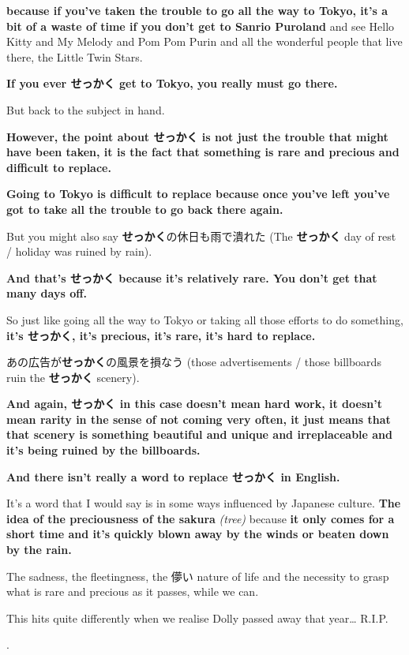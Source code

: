 {\bf because if you've taken the trouble to go all the way to Tokyo, it's a bit of a waste of time if you don't get to Sanrio Puroland} and see Hello Kitty and My Melody and Pom Pom Purin and all the wonderful people that live there, the Little Twin Stars.

{\bf If you ever せっかく get to Tokyo, you really must go there.}

\thinrule

But back to the subject in hand.

{\bf However, the point about せっかく is not just the trouble that might have been taken, it is the fact that something is rare and precious and difficult to replace.}

{\bf Going to Tokyo is difficult to replace because once you've left you've got to take all the trouble to go back there again.}

But you might also say {\bf せっかく}の休日も雨で潰れた (The {\bf せっかく} day of rest / holiday was ruined by rain).

{}

{\bf And that's せっかく because it's relatively rare. You don't get that many days off.}

So just like going all the way to Tokyo or taking all those efforts to do something, {\bf it's せっかく, it's precious, it's rare, it's hard to replace.}

あの広告が{\bf せっかく}の風景を損なう (those advertisements / those billboards ruin the {\bf せっかく} scenery).

{}

{\bf And again, せっかく in this case doesn't mean hard work, it doesn't mean rarity in the sense of not coming very often, it just means that that scenery is something beautiful and unique and irreplaceable and it's being ruined by the billboards.}

\thinrule

{\bf And there isn't really a word to replace せっかく in English.}

It's a word that I would say is in some ways influenced by Japanese culture. {\bf The idea of the preciousness of the sakura} {\em (tree)} because {\bf it only comes for a short time and it's quickly blown away by the winds or beaten down by the rain.}

{}

The sadness, the fleetingness, the 儚い nature of life and the necessity to grasp what is rare and precious as it passes, while we can.

This hits quite differently when we realise Dolly passed away that year\ldots{} R.I.P. 🙁

.

\stopsectionlevel

\stopsectionlevel

\stopsectionlevel
